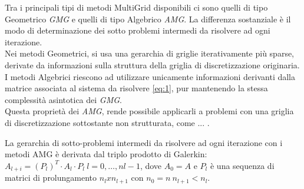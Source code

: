 Tra i principali tipi di metodi MultiGrid disponibili ci sono quelli di tipo Geometrico \emph{GMG} e quelli di tipo Algebrico \emph{AMG}.
La differenza sostanziale è il modo di determinazione dei sotto problemi intermedi da risolvere ad ogni iterazione.\\
Nei metodi Geometrici, si usa una gerarchia di griglie iterativamente più sparse,%
derivate da informazioni sulla struttura della griglia di discretizzazione originaria.\\
I metodi Algebrici riescono ad utilizzare unicamente informazioni derivanti dalla matrice associata al sistema da risolvere \ref{eq:1},
pur mantenendo la stessa complessità asintotica dei \emph{GMG}.\\
Questa proprietà dei \emph{AMG}, rende possibile applicarli a problemi con una griglia di discretizzazione sottostante non strutturata, come ...
\cite{AMGgeneralANY}.\\
\par\null\par	%
La gerarchia di sotto-problemi intermedi da risolvere ad ogni iterazione con i metodi AMG è derivata dal triplo prodotto di Galerkin:\\
$A_{l+i} = (P_l)^T \cdot A_l \cdot P_l~l=0,\dots,nl-1$, dove $A_0 = A$ \cite{amgProf}
e $P_l$ è una sequenza di matrici di prolungamento $n_l x n_{l+1}$ con $n_0=n~n_{l+1}<n_l$.\\
\par\null\par
